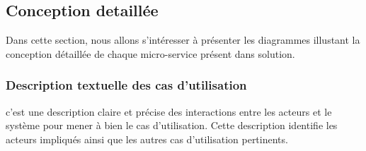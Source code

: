 \subsection{Conception detaillée}
\par Dans cette section, nous allons s'intéresser à présenter les diagrammes illustant la conception détaillée de chaque micro-service présent dans solution.
\subsubsection{Description textuelle des cas d'utilisation}
\par c'est une description claire et précise des interactions entre les acteurs et le système pour mener à bien le cas d'utilisation. Cette description identifie les acteurs impliqués ainsi que les autres cas d'utilisation pertinents\cite{descp}.
